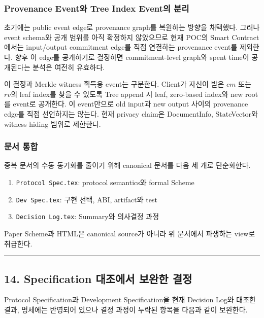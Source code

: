 \documentclass[11pt]{extarticle}
\begin{document}
\subsubsection{Provenance Event와 Tree Index Event의 분리}

초기에는 public event edge로 provenance graph를 복원하는 방향을 채택했다. 그러나
event schema와 공개 범위를 아직 확정하지 않았으므로 현재 POC의 Smart Contract에서는
input/output commitment edge를 직접 연결하는 provenance event를 제외한다. 향후 이
edge를 공개하기로 결정하면 commitment-level graph와 spent time이 공개된다는 분석은
여전히 유효하다.

이 결정과 Merkle witness 획득용 event는 구분한다. Client가 자신이 받은 $cm$ 또는
$rv$의 leaf index를 찾을 수 있도록 Tree append 시 leaf, zero-based index와 new root를
event로 공개한다. 이 event만으로 old input과 new output 사이의 provenance edge를
직접 선언하지는 않는다. 현재 privacy claim은 DocumentInfo, StateVector와 witness
hiding 범위로 제한한다.

\subsubsection{문서 통합}

중복 문서의 수동 동기화를 줄이기 위해 canonical 문서를 다음 세 개로 단순화한다.

\begin{enumerate}
  \item \texttt{Protocol Spec.tex}: protocol semantics와 formal Scheme
  \item \texttt{Dev Spec.tex}: 구현 선택, ABI, artifact와 test
  \item \texttt{Decision Log.tex}: Summary와 의사결정 과정
\end{enumerate}

Paper Scheme과 HTML은 canonical source가 아니라 위 문서에서 파생하는 view로 취급한다.

\begin{center}\rule{0.5\linewidth}{0.5pt}\end{center}

\subsection{14. Specification 대조에서 보완한 결정}

Protocol Specification과 Development Specification을 현재 Decision Log와 대조한 결과,
명세에는 반영되어 있으나 결정 과정이 누락된 항목을 다음과 같이 보완한다.
\end{document}
